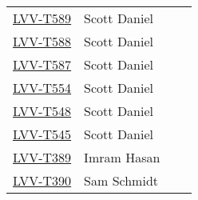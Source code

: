 \documentclass[DM,lsstdraft,STR,toc]{lsstdoc}
\begin{document}
\begin{longtable}{p{3cm}p{3cm}p{3cm}p{6cm}}
\begin{minipage}[]{6cm}
\smallskip
{\small  }
\medskip
\end{minipage}
\\ \hline
\href{https://jira.lsstcorp.org/secure/Tests.jspa#/testCase/LVV-T589}{LVV-T589}
& {\small Scott Daniel } & {\small  } &
\begin{minipage}[]{6cm}
\smallskip
{\small  }
\medskip
\end{minipage}
\\ \hline
\href{https://jira.lsstcorp.org/secure/Tests.jspa#/testCase/LVV-T588}{LVV-T588}
& {\small Scott Daniel } & {\small  } &
\begin{minipage}[]{6cm}
\smallskip
{\small  }
\medskip
\end{minipage}
\\ \hline
\href{https://jira.lsstcorp.org/secure/Tests.jspa#/testCase/LVV-T587}{LVV-T587}
& {\small Scott Daniel } & {\small  } &
\begin{minipage}[]{6cm}
\smallskip
{\small  }
\medskip
\end{minipage}
\\ \hline
\href{https://jira.lsstcorp.org/secure/Tests.jspa#/testCase/LVV-T554}{LVV-T554}
& {\small Scott Daniel } & {\small  } &
\begin{minipage}[]{6cm}
\smallskip
{\small  }
\medskip
\end{minipage}
\\ \hline
\href{https://jira.lsstcorp.org/secure/Tests.jspa#/testCase/LVV-T548}{LVV-T548}
& {\small Scott Daniel } & {\small  } &
\begin{minipage}[]{6cm}
\smallskip
{\small  }
\medskip
\end{minipage}
\\ \hline
\href{https://jira.lsstcorp.org/secure/Tests.jspa#/testCase/LVV-T545}{LVV-T545}
& {\small Scott Daniel } & {\small  } &
\begin{minipage}[]{6cm}
\smallskip
{\small  }
\medskip
\end{minipage}
\\ \hline
\href{https://jira.lsstcorp.org/secure/Tests.jspa#/testCase/LVV-T389}{LVV-T389}
& {\small Imram Hasan } & {\small  } &
\begin{minipage}[]{6cm}
\smallskip
{\small  }
\medskip
\end{minipage}
\\ \hline
\href{https://jira.lsstcorp.org/secure/Tests.jspa#/testCase/LVV-T390}{LVV-T390}
& {\small Sam Schmidt } & {\small  } &
\begin{minipage}[]{6cm}

\end{minipage}
\end{longtable}
\end{document}

